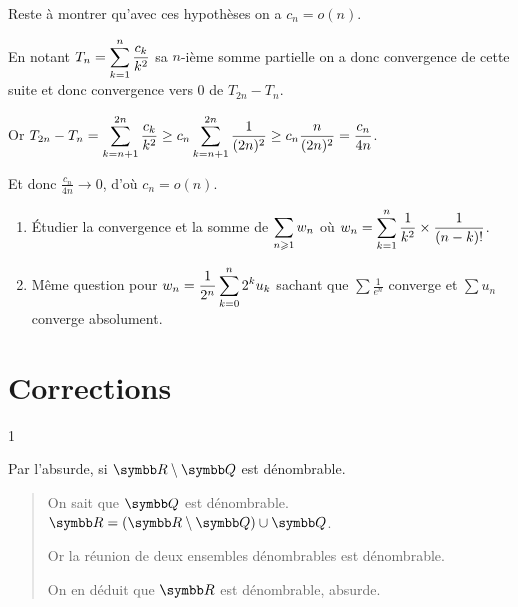 \begin{exercice}
    Reste à montrer qu'avec ces hypothèses on a $c_{n}=o(n)$.

    En notant $\displaystyle T_{n}=\sum_{k=1}^{n}\frac{c_{k}}{k^{2}}$ sa $n$-ième somme partielle 
    on a donc convergence de cette suite et donc convergence vers 0 de $T_{2n}-T_{n}$.

    Or $\displaystyle T_{2n}-T_{n}=\sum_{k=n+1}^{2n}\frac{c_{k}}{k^{2}}\ge c_{n}\sum_{k=n+1}^{2n}\frac{1}{(2n)^{2}}\ge c_{n}\frac{n}{(2n)^{2}} = \frac{c_n}{4n}$.

    Et donc $\frac{c_n}{4n} \to 0$, d'où $c_{n}=o(n)$.
\end{exercice}

\begin{exercice}
\begin{enumerate}
    \item Étudier la convergence et la somme de $\displaystyle \sum_{n\geqslant1} w_n$ où $\displaystyle w_n = \sum_{k=1}^n \frac{1}{k^2} \times \frac{1}{(n-k)!}$.
    \item Même question pour $\displaystyle w_n = \frac{1}{2^n} \sum_{k=0}^n 2^k u_k$ sachant que $\sum \frac{1}{e^n}$ converge et $\sum u_n$ converge absolument.
\end{enumerate}
\end{exercice}

\newpage
\section{Corrections}

\begin{correction}{1}

Par l'absurde, si $\R \setminus \Q$ est dénombrable.
\begin{quote}
    On sait que $\Q$ est dénombrable.
    $\R = (\R \setminus \Q) \cup \Q$.

    Or la réunion de deux ensembles dénombrables est dénombrable.
    
    On en déduit que $\R$ est dénombrable, absurde.
\end{quote}
\end{correction}

